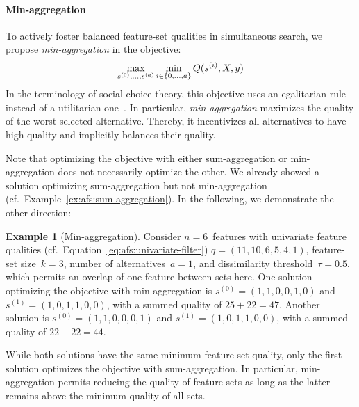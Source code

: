 \documentclass{article}
\theoremstyle{definition}
\newtheorem{example}{Example}
\begin{document}
\paragraph{Min-aggregation}

To actively foster balanced feature-set qualities in simultaneous search, we propose \emph{min-aggregation} in the objective:
%
\begin{equation}
	\max_{s^{(0)}, \dots, s^{(a)}} \min_{i \in \{0, \dots, a\}} Q(s^{(i)},X,y) \\
	\label{eq:afs:afs-simultaneous-min-objective}
\end{equation}
%
In the terminology of social choice theory, this objective uses an egalitarian rule instead of a utilitarian one~\cite{myerson1981utilitarianism}.
In particular, \emph{min-aggregation} maximizes the quality of the worst selected alternative.
Thereby, it incentivizes all alternatives to have high quality and implicitly balances their quality.

Note that optimizing the objective with either sum-aggregation or min-aggregation does not necessarily optimize the other.
We already showed a solution optimizing sum-aggregation but not min-aggregation (cf.~Example~\ref{ex:afs:sum-aggregation}).
In the following, we demonstrate the other direction:
%
\begin{example}[Min-aggregation]
Consider $n=6$~features with univariate feature qualities (cf.~Equation~\ref{eq:afs:univariate-filter}) $q = (11,10,6,5,4,1)$, feature-set size~$k=3$, number of alternatives~$a=1$, and dissimilarity threshold~$\tau = 0.5$, which permits an overlap of one feature between sets here.
One solution optimizing the objective with min-aggregation is $s^{(0)} = (1,1,0,0,1,0)$ and $s^{(1)} = (1,0,1,1,0,0)$, with a summed quality of $25+22=47$.
Another solution is $s^{(0)} = (1,1,0,0,0,1)$ and $s^{(1)} = (1,0,1,1,0,0)$, with a summed quality of $22+22=44$.
\label{ex:afs:min-aggregation}
\end{example}
%
While both solutions have the same minimum feature-set quality, only the first solution optimizes the objective with sum-aggregation.
In particular, min-aggregation permits reducing the quality of feature sets as long as the latter remains above the minimum quality of all sets.
\end{document}
